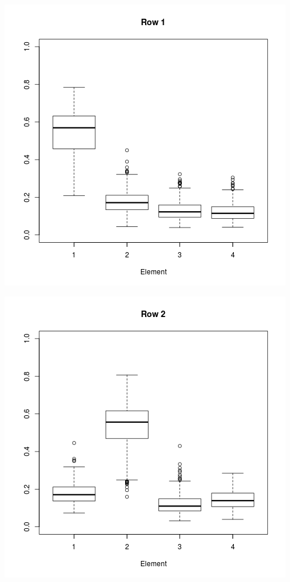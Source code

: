 \documentclass[11pt,a4paper]{report}
\begin{document}
\begin{center}
\includegraphics[scale=0.6]{row1.png}
\end{center}
\begin{center}
\includegraphics[scale=0.6]{row2.png}
\end{center}
\end{document}
